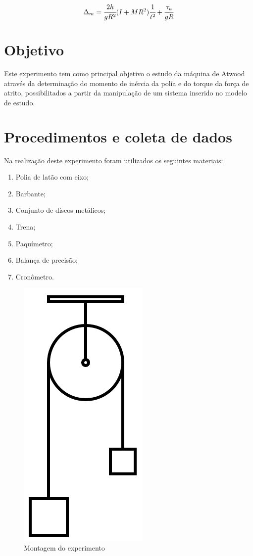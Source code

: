 \documentclass[a4paper]{article}
\begin{document}
\begin{align}
\Delta_m=\cfrac{2h}{gR^{2}}(I+MR^{2})\ensuremath{\cfrac{1}{t^{2}}}+\cfrac{\tau_{a}}{gR}
\end{align}


\section{Objetivo}
	Este experimento tem como principal objetivo o estudo da máquina de Atwood através da determinação do momento de inércia da polia e do torque da força de atrito, possibilitados a partir da manipulação de um sistema inserido no modelo de estudo.


\section{Procedimentos e coleta de dados}

Na realização deste experimento foram utilizados os seguintes materiais: 
\begin{enumerate} 
	\item Polia de latão com eixo;
	\item Barbante;
	\item Conjunto de discos metálicos;
	\item Trena;
	\item Paquímetro;
	\item Balança de precisão;
	\item Cronômetro.
 \end {enumerate} 

\begin{figure}[!ht]
	\centering
	\includegraphics[scale=0.25]{Atwood_machine.jpg}
	\caption{Montagem do experimento}
\end{figure}
\end{document}
